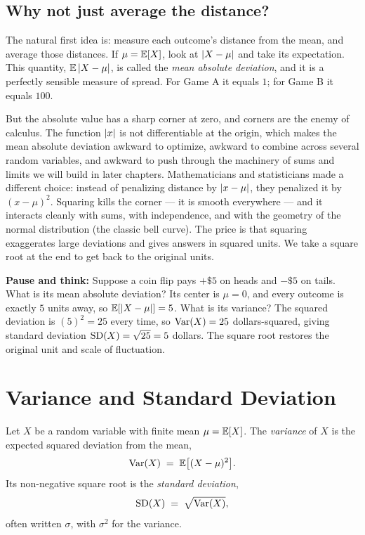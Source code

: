 \subsection{Why not just average the distance?}

The natural first idea is: measure each outcome's distance from the mean, and
average those distances. If $\mu = \operatorname{\mathbb{E}}[X]$, look at $\lvert X - \mu\rvert$ and take
its expectation. This quantity, $\operatorname{\mathbb{E}}\,\lvert X-\mu\rvert$, is called the \emph{mean
absolute deviation}, and it is a perfectly sensible measure of spread. For
Game A it equals $1$; for Game B it equals $100$.

But the absolute value has a sharp corner at zero, and corners are the enemy
of calculus. The function $\lvert x\rvert$ is not differentiable at the origin,
which makes the mean absolute deviation awkward to optimize, awkward to
combine across several random variables, and awkward to push through the
machinery of sums and limits we will build in later chapters. Mathematicians
and statisticians made a different choice: instead of penalizing distance by $\lvert x-\mu\rvert$, they penalized
it by $(x-\mu)^2$. Squaring kills the corner --- it is smooth everywhere ---
and it interacts cleanly with sums, with independence,
and with the geometry of the normal distribution (the classic bell curve). The price is that squaring
exaggerates large deviations and gives answers in squared units. We take a square root at the end to get back to the
original units.

\begin{recoverybox}
\textbf{Pause and think:} Suppose a coin flip pays $+\$5$ on heads and $-\$5$ on tails.
What is its mean absolute deviation? Its center is $\mu = 0$, and every outcome is exactly
$5$ units away, so $\operatorname{\mathbb{E}}[\lvert X-\mu\rvert] = 5$. What is its variance?
The squared deviation is $(5)^2 = 25$ every time, so $\operatorname{Var}(X) = 25$ dollars-squared,
giving standard deviation $\operatorname{SD}(X) = \sqrt{25} = 5$ dollars. The square root
restores the original unit and scale of fluctuation.
\end{recoverybox}

\section{Variance and Standard Deviation}
\label{ch09:defn}

\begin{definition}[Variance]
\label{ch09:def-var}
Let $X$ be a random variable with finite mean $\mu = \operatorname{\mathbb{E}}[X]$. The
\emph{variance} of $X$ is the expected squared deviation from the mean,
\[
  \operatorname{Var}(X) \;=\; \operatorname{\mathbb{E}}\!\big[(X-\mu)^2\big].
\]
Its non-negative square root is the \emph{standard deviation},
\[
  \operatorname{SD}(X) \;=\; \sqrt{\operatorname{Var}(X)},
\]
often written $\sigma$, with $\sigma^2$ for the variance.
\end{definition}

